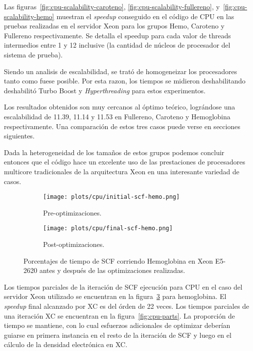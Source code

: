 Las figuras~\ref{fig:cpu-scalability-caroteno}, \ref{fig:cpu-scalability-fullereno},
y~\ref{fig:cpu-scalability-hemo} muestran el \textit{speedup} conseguido en
el c\'odigo de CPU en las pruebas realizadas en el servidor Xeon para los grupos
Hemo, Caroteno y Fullereno respectivamente. Se detalla el speedup para cada
valor de threads intermedios entre 1 y 12 inclusive (la cantidad de n\'ucleos de
procesador del sistema de prueba).

Siendo un analisis de escalabilidad, se trat\'o de homogeneizar los procesadores
tanto como fuese posible. Por esta razon, los tiempos se midieron deshabilitando
deshabilit\'o Turbo Boost y \textit{Hyperthreading} para estos experimentos.

Los resultados obtenidos son muy cercanos al \'optimo te\'orico, logr\'andose una escalabilidad de 11.39,
11.14 y 11.53 en Fullereno, Caroteno y Hemoglobina respectivamente. Una comparaci\'on
de estos tres casos puede verse en secciones siguientes.

Dada la heterogeneidad de los tama\~nos de estos grupos podemos concluir entonces que el c\'odigo
hace un excelente uso de las prestaciones de procesadores multicore tradicionales
de la arquitectura Xeon en una interesante variedad de casos.

\begin{figure}[htbp]
\centering
\begin{subfigure}[b]{\plotwidthtres}
   \texttt{[image: plots/cpu/initial-scf-hemo.png]}
   \caption{Pre-optimizaciones.}
   \label{fig:initial-cpu-scf}
 \end{subfigure}
 \begin{subfigure}[b]{\plotwidthtres}
   \texttt{[image: plots/cpu/final-scf-hemo.png]}
   \caption{Post-optimizaciones.}
   \label{fig:final-cpu-scf}
 \end{subfigure}
 \caption{Porcentajes de tiempo de SCF corriendo Hemoglobina en Xeon E5-2620 antes y despu\'es de
 las optimizaciones realizadas.}
 \label{fig:cpu-scf}
\end{figure}

Los tiempos parciales de la iteraci\'on de SCF ejecuci\'on para CPU en el caso del servidor Xeon
utilizado se encuentran en la figura~\ref{fig:cpu-scf} para hemoglobina. El \textit{speedup} final alcanzado por XC es del
\'orden de 22 veces.
Los tiempos parciales de una iteraci\'on XC se encuentran en la figura~\ref{fig:cpu-parts}. La
proporci\'on de tiempo se mantiene, con lo cual esfuerzos adicionales de optimizar deber\'ian
guiarse en primera instancia en el resto de la iteraci\'on de SCF y luego en el c\'alculo de
la densidad electr\'onica en XC.

